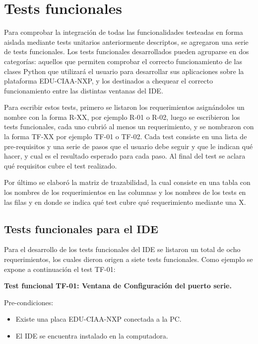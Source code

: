 \section{Tests funcionales}
\label{sec:testFuncionales}

Para comprobar la integración de todas las funcionalidades testeadas en forma aislada mediante tests unitarios anteriormente descriptos, se agregaron una serie de tests funcionales. Los tests funcionales desarrollados pueden agruparse en dos categorías: aquellos que permiten comprobar el correcto funcionamiento de las clases Python que utilizará el usuario para desarrollar sus aplicaciones sobre la plataforma EDU-CIAA-NXP, y los destinados a chequear el correcto funcionamiento entre las distintas ventanas del IDE.

Para escribir estos tests, primero se listaron los requerimientos asignándoles un nombre con la forma R-XX, por ejemplo R-01 o R-02, luego se escribieron los tests funcionales, cada uno cubrió al menos un requerimiento, y se nombraron con la forma TF-XX por ejemplo TF-01 o TF-02. Cada test consiste en una lista de pre-requisitos y una serie de pasos que el usuario debe seguir y que le indican qué hacer, y cual es el resultado esperado para cada paso. Al final del test se aclara qué requisitos cubre el test realizado.

Por último se elaboró la matriz de trazabilidad, la cual consiste en una tabla con los nombres de los requerimientos en las columnas y los nombres de los tests en las filas y en donde se indica qué test cubre qué requerimiento mediante una X.


\subsection{Tests funcionales para el IDE}

Para el desarrollo de los tests funcionales del IDE se listaron un total de ocho requerimientos, los cuales dieron origen a siete tests funcionales. Como ejemplo se expone a continuación el test TF-01:

\textbf{Test funcional TF-01: Ventana de Configuración del puerto serie.}

Pre-condiciones:
\begin{itemize}
	\item Existe una placa EDU-CIAA-NXP conectada a la PC.
	\item El IDE se encuentra instalado en la computadora.
\end{itemize}

